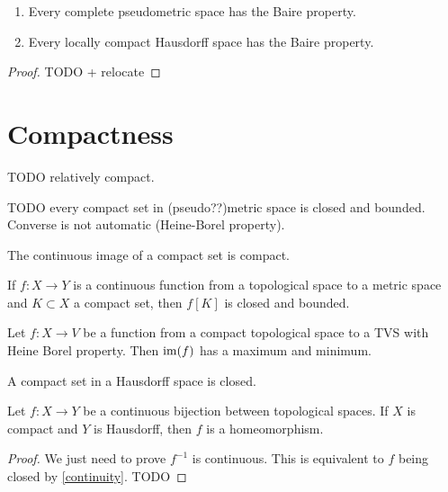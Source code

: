 \begin{theorem} \label{BaireCategory} \hspace{1em}
\begin{enumerate}
\item Every complete pseudometric space has the Baire property.
\item Every locally compact Hausdorff space has the Baire property.
\end{enumerate}
\end{theorem}
\begin{proof}
TODO + relocate
\end{proof}


\section{Compactness}
TODO relatively compact.

TODO every compact set in (pseudo??)metric space is closed and bounded. Converse is not automatic (Heine-Borel property).

\begin{proposition} \label{imageCompactIsCompact}
The continuous image of a compact set is compact.
\end{proposition}
\begin{corollary} \label{imageCompactIsClosedBounded}
If $f:X\to Y$ is a continuous function from a topological space to a metric space and $K\subset X$ a compact set, then $f[K]$ is closed and bounded.
\end{corollary}
\begin{corollary}
Let $f:X\to V$ be a function from a compact topological space to a TVS with Heine Borel property. Then $\operatorname{im}(f)$ has a maximum and minimum.
\end{corollary}

\begin{proposition}
A compact set in a Hausdorff space is closed.
\end{proposition}

\begin{proposition} \label{compactToHausdorffHomeomorphism}
Let $f:X\to Y$ be a continuous bijection between topological spaces. If $X$ is compact and $Y$ is Hausdorff, then $f$ is a homeomorphism.
\end{proposition}
\begin{proof}
We just need to prove $f^{-1}$ is continuous. This is equivalent to $f$ being closed by \ref{continuity}. TODO
\end{proof}

